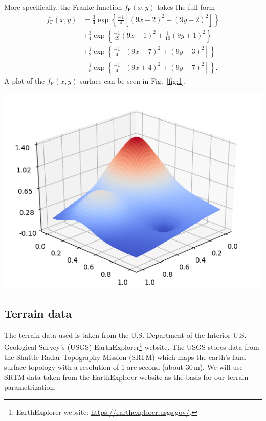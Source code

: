 \documentclass[a4paper]{article}
\newcommand{\fig}[1]{Fig.\ \ref{fig:#1}}
\newenvironment{Figure}
  {\par\medskip\noindent\minipage{\linewidth}}
  {\endminipage\par\medskip}
\begin{document}
\begin{multicols}{2}
More specifically, the Franke function $f_\text{F}(x,y)$ takes the full form
\begin{align}
f_\text{F}(x,y) &= \frac{3}{4}\exp\left\{\frac{-1}{4}\left[\left(9x-2\right)^2 + \left(9y-2\right)^2\right]\right\}\nonumber \\
&+ \frac{3}{4}\exp\left\{\frac{-1}{49}\left(9x+1\right)^2 + \frac{1}{10}\left(9y+1\right)^2\right\}\nonumber \\
&+ \frac{1}{2}\exp\left\{\frac{-1}{4}\left[\left(9x-7\right)^2 + \left(9y-3\right)^2\right]\right\}\nonumber \\
&- \frac{1}{5}\exp\left\{\frac{-1}{4}\left[\left(9x+4\right)^2 + \left(9y-7\right)^2\right]\right\}.
\end{align}
A plot of the $f_\text{F}(x,y)$ surface can be seen in \fig{1}.

\begin{Figure}
\centering
\includegraphics[width=\linewidth]{franke.png}
\end{Figure}

\subsection{Terrain data}
The terrain data used is taken from the U.S. Department of the Interior U.S. Geological Survey's (USGS) EarthExplorer\footnote{EarthExplorer website: \url{https://earthexplorer.usgs.gov/}.} website. The USGS stores data from the Shuttle Radar Topography Mission (SRTM) which maps the earth's land surface topology with a resolution of 1 arc-second (about $30\,\text{m}$). We will use SRTM data taken from the EarthExplorer website as the basis for our terrain parametrization.


\end{multicols}
\end{document}
